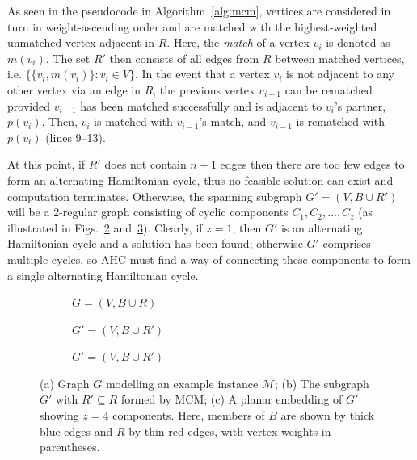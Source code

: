\documentclass[a4paper,11pt,authoryear]{elsarticle}
\begin{document}
\noindent As seen in the pseudocode in Algorithm~\ref{alg:mcm}, vertices are considered in turn in weight-ascending order and are matched with the highest-weighted unmatched vertex adjacent in $R$. Here, the \emph{match} of a vertex $v_i$ is denoted as $m(v_i)$. The set $R'$ then consists of all edges from $R$ between matched vertices, i.e. $\{\{v_i, m(v_i)\} : v_i \in V \}$. In the event that a vertex $v_i$ is not adjacent to any other vertex via an edge in $R$, the previous vertex $v_{i-1}$ can be rematched provided $v_{i-1}$ has been matched successfully and is adjacent to $v_i$'s partner, $p(v_i)$. Then, $v_i$ is matched with $v_{i-1}$'s match, and $v_{i-1}$ is rematched with $p(v_i)$ (lines 9--13).

At this point, if $R'$ does not contain $n+1$ edges then there are too few edges to form an alternating Hamiltonian cycle, thus no feasible solution can exist and computation terminates. Otherwise, the spanning subgraph $G'=(V, B \cup R')$ will be a 2-regular graph consisting of cyclic components $C_1,C_2,\dotsc,C_z$ (as illustrated in Figs.~\ref{fig:matching} and~\ref{fig:mps}). Clearly, if $z = 1$, then $G'$ is an alternating Hamiltonian cycle and a solution has been found; otherwise $G'$ comprises multiple cycles, so AHC must find a way of connecting these components to form a single alternating Hamiltonian cycle.

\begin{figure}[h!]	
	\centering
	\begin{subfigure}[h]{0.33\textwidth}
		
		\vspace{-2mm}
		\caption{$G = (V, B \cup R)$}
		\label{fig:threshold}
	\end{subfigure} \hspace{5mm}
	\begin{subfigure}[h]{0.33\textwidth}
		
		\vspace{-2mm}
		\caption{$G' = (V, B \cup R')$}
		\label{fig:matching}
	\end{subfigure} \hspace{7mm}
	\begin{subfigure}[h]{0.2\textwidth}
		
		\caption{$G' = (V, B \cup R')$}
		\label{fig:mps}
	\end{subfigure}
	\caption{(a) Graph $G$ modelling an example instance $\mathcal{M}$; (b) The subgraph $G'$ with $R' \subseteq R$ formed by MCM; (c) A planar embedding of $G'$ showing $z = 4$ components. Here, members of $B$ are shown by thick blue edges and $R$ by thin red edges, with vertex weights in parentheses.}
	\label{fig:mcm}
\end{figure}
\end{document}
